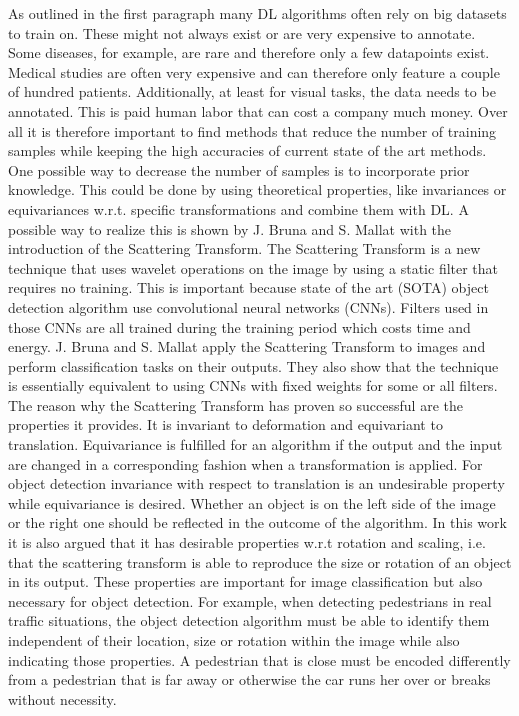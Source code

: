 As outlined in the first paragraph many DL algorithms often rely on big datasets to train on. These might not always exist or are very expensive to annotate. Some diseases, for example, are rare and therefore only a few datapoints exist. Medical studies are often very expensive and can therefore only feature a couple of hundred patients. Additionally, at least for visual tasks, the data needs to be annotated. This is paid human labor that can cost a company much money. Over all it is therefore important to find methods that reduce the number of training samples while keeping the high accuracies of current state of the art methods. 
One possible way to decrease the number of samples is to incorporate prior knowledge. This could be done by using theoretical properties, like invariances or equivariances w.r.t. specific transformations and combine them with DL. 
A possible way to realize this is shown by J. Bruna and
S. Mallat \cite{scatteringTransform2012} with the introduction of the Scattering Transform. The Scattering Transform is a new technique that uses wavelet operations on the image by using a static filter that requires no training. This is important because state of the art (SOTA) object detection algorithm use convolutional neural networks (CNNs). Filters used in those CNNs are all trained during the training period which costs time and energy.
J. Bruna and S. Mallat \cite{scatteringTransform2012} apply the Scattering Transform to images and perform classification tasks on their outputs. They also show that the technique is essentially equivalent to using CNNs with fixed weights for some or all filters. 
The reason why the Scattering Transform has proven so successful are the properties it provides. It is invariant to deformation and equivariant to translation. Equivariance is fulfilled for an algorithm if the output and the input are changed in a corresponding fashion when a transformation is applied. For object detection invariance with respect to translation is an undesirable property while equivariance is desired. Whether an object is on the left side of the image or the right one should be reflected in the outcome of the algorithm.  In this work it is also argued that it has desirable properties w.r.t rotation and scaling, i.e. that the scattering transform is able to reproduce the size or rotation of an object in its output. These properties are important for image classification but also necessary for object detection. For example, when detecting pedestrians in real traffic situations, the object detection algorithm must be able to identify them independent of their location, size or rotation within the image while also indicating those properties. A pedestrian that is close must be encoded differently from a pedestrian that is far away or otherwise the car runs her over or breaks without necessity. \\

